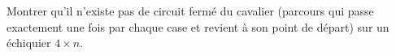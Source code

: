 Montrer qu'il n'existe pas de circuit fermé du cavalier (parcours qui passe exactement une fois par chaque case et revient à son point de départ) sur un échiquier $4 \times n$.
